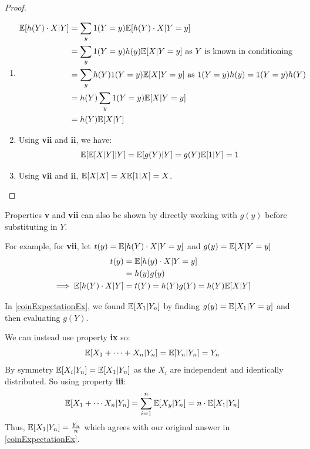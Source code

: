 \documentclass[../main.tex]{subfiles}
\begin{document}
\begin{proof}
\begin{enumerate}
      From \cref{rvFunctionIndependence}, we know that $Y \perp Z \implies g(Y) \perp Z$.
      Thus we can apply \textbf{v} and \textbf{iv} to yield:
      \[
        \E[g(Y) \vert Z] =  \E[g(Y)] = \E[\E[X \vert Y]] = \E[X]
      \]
    \item
      \begin{align*}
        \mathbb{E}[h(Y) \cdot X \vert Y] &= \sum_{y} 1(Y = y) \mathbb{E}[h(Y) \cdot X \vert Y = y] \\
                                 &= \sum_{y} 1(Y = y) h(y) \mathbb{E}[X \vert Y = y] \text{ as $Y$ is known in conditioning}\\
                                 &= \sum_{y} h(Y) 1(Y = y) \mathbb{E}[X \vert Y = y] \text{ as $1(Y = y)h(y) = 1(Y = y)h(Y)$} \\
                                 &= h(Y) \sum_{y} 1(Y = y) \mathbb{E}[X \vert Y = y] \\
                                 &= h(Y) \mathbb{E}[X \vert Y]
      \end{align*}
    \item Using \textbf{vii} and \textbf{ii}, we have:
      \[
        \mathbb{E}[\mathbb{E}[X \vert Y] \vert Y] = \mathbb{E}[g(Y) \vert Y] = g(Y) \mathbb{E}[1 \vert Y] = 1
      \]
    \item Using \textbf{vii} and \textbf{ii}, $\mathbb{E}[X \vert X] = X\mathbb{E}[1 \vert X] = X$.
  \end{enumerate}
\end{proof}
\begin{remark}
  Properties \textbf{v} and \textbf{vii} can also be shown by directly working with $g(y)$ before substituting in $Y$.

  For example, for \textbf{vii}, let $t(y) = \mathbb{E}[h(Y) \cdot X \vert Y = y]$ and $g(y) = \mathbb{E}[X \vert Y = y]$
  \begin{align*}
    t(y) &= \mathbb{E}[h(y) \cdot X \vert Y = y] \\
         &= h(y)g(y) \\
    \implies \mathbb{E}[h(Y) \cdot X \vert Y] &= t(Y) = h(Y)g(Y) = h(Y)\mathbb{E}[X \vert Y]
  \end{align*}
\end{remark}
\begin{example}
  In \cref{coinExpectationEx}, we found $\mathbb{E}[X_1 \vert Y_n]$ by finding $g(y) = \mathbb{E}[X_1 \vert Y = y]$ and then evaluating $g(Y)$.

  We can instead use property \textbf{ix} so:
  \[
    \mathbb{E}[X_1 + \cdots + X_n \vert Y_n] = \mathbb{E}[Y_n \vert Y_n] = Y_n
  \]
  By symmetry $\mathbb{E}[X_i \vert Y_n] = \mathbb{E}[X_1 \vert Y_n]$ as the $X_i$ are independent and identically distributed.
  So using property \textbf{iii}:
  \[
    \mathbb{E}[X_1 + \cdots X_n \vert Y_n] = \sum_{i = 1}^{n} \mathbb{E}[X_y \vert Y_n] = n \cdot \mathbb{E}[X_1 \vert Y_n]
  \]
  Thus, $\mathbb{E}[X_1 \vert Y_n] = \frac{Y_n}{n}$ which agrees with our original answer in \cref{coinExpectationEx}.
\end{example}
\end{document}
